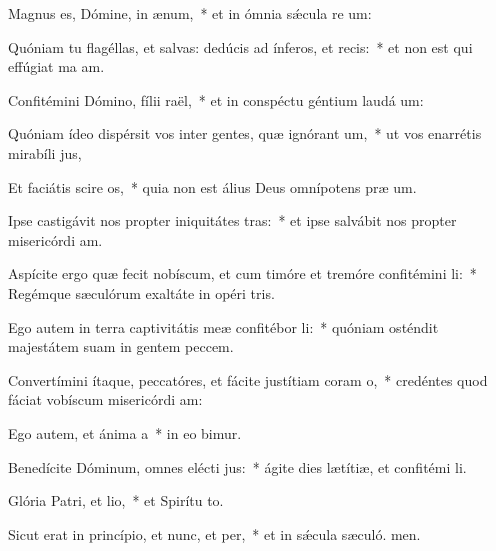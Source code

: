 \item Magnus es, Dómine, in ænum,~* et in ómnia sǽcula re um:
\item Quóniam tu flagéllas, et salvas: dedúcis ad ínferos, et recis:~* et non est qui effúgiat ma am.
\item Confitémini Dómino, fílii raël,~* et in conspéctu géntium laudá um:
\item Quóniam ídeo dispérsit vos inter gentes, quæ ignórant um,~* ut vos enarrétis mirabíli jus,
\item Et faciátis scire os,~* quia non est álius Deus omnípotens præ um.
\item Ipse castigávit nos propter iniquitátes tras:~* et ipse salvábit nos propter misericórdi am.
\item Aspícite ergo quæ fecit nobíscum, et cum timóre et tremóre confitémini li:~* Regémque sæculórum exaltáte in opéri tris.
\item Ego autem in terra captivitátis meæ confitébor li:~* quóniam osténdit majestátem suam in gentem peccem.
\item Convertímini ítaque, peccatóres, et fácite justítiam coram o,~* credéntes quod fáciat vobíscum misericórdi am:
\item Ego autem, et ánima a~* in eo bimur.
\item Benedícite Dóminum, omnes elécti jus:~* ágite dies lætítiæ, et confitémi li.
\item Glória Patri, et lio,~* et Spirítu to.
\item Sicut erat in princípio, et nunc, et per,~* et in sǽcula sæculó. men.

